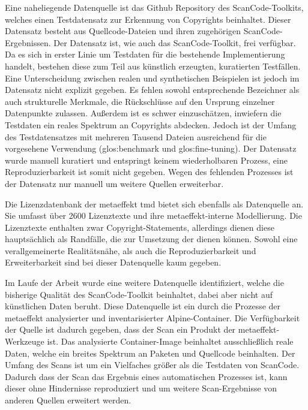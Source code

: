 Eine naheliegende Datenquelle ist das Github Repository des ScanCode-Toolkits, welches einen Testdatensatz zur Erkennung von Copyrights beinhaltet.
Dieser Datensatz besteht aus Quellcode-Dateien und ihren zugehörigen ScanCode-Ergebnissen.
Der Datensatz ist, wie auch das ScanCode-Toolkit, frei verfügbar.
Da es sich in erster Linie um Testdaten für die bestehende Implementierung handelt, bestehen diese zum Teil aus künstlich erzeugten, kuratierten Testfällen.
Eine Unterscheidung zwischen realen und synthetischen Beispielen ist jedoch im Datensatz nicht explizit gegeben.
Es fehlen sowohl entsprechende Bezeichner als auch strukturelle Merkmale, die Rückschlüsse auf den Ursprung einzelner Datenpunkte zulassen.
Außerdem ist es schwer einzuschätzen, inwiefern die Testdaten ein reales Spektrum an Copyrights abdecken.
Jedoch ist der Umfang des Testdatensatzes mit mehreren Tausend Dateien ausreichend für die vorgesehene Verwendung (\gls{glos:benchmark} und \gls{glos:fine-tuning}).
Der Datensatz wurde manuell kuratiert und entspringt keinem wiederholbaren Prozess, eine Reproduzierbarkeit ist somit nicht gegeben.
Wegen des fehlenden Prozesses ist der Datensatz nur manuell um weitere Quellen erweiterbar.

Die Lizenzdatenbank der metaeffekt \gls{tmd} bietet sich ebenfalls als Datenquelle an.
Sie umfasst über \num{2600} Lizenztexte und ihre metaeffekt-interne Modellierung.
Die Lizenztexte enthalten zwar Copyright-Statements, allerdings dienen diese hauptsächlich als Randfälle, die zur Umsetzung der  dienen können.
Sowohl eine verallgemeinerte Realitätsnähe, als auch die Reproduzierbarkeit und Erweiterbarkeit sind bei dieser Datenquelle kaum gegeben.

Im Laufe der Arbeit wurde eine weitere Datenquelle identifiziert, welche die bisherige Qualität des ScanCode-Toolkit beinhaltet, dabei aber nicht auf künstlichen Daten beruht.
Diese Datenquelle ist ein durch die Prozesse der metaeffekt analysierter und inventarisierter Alpine-Container.
Die Verfügbarkeit der Quelle ist dadurch gegeben, dass der Scan ein Produkt der metaeffekt-Werkzeuge ist.
Das analysierte Container-Image beinhaltet ausschließlich reale Daten, welche ein breites Spektrum an Paketen und Quellcode beinhalten.
Der Umfang des Scans ist um ein Vielfaches größer als die Testdaten von ScanCode.
Dadurch dass der Scan das Ergebnis eines automatischen Prozesses ist, kann dieser ohne Hindernisse reproduziert und um weitere Scan-Ergebnisse von anderen Quellen erweitert werden.

